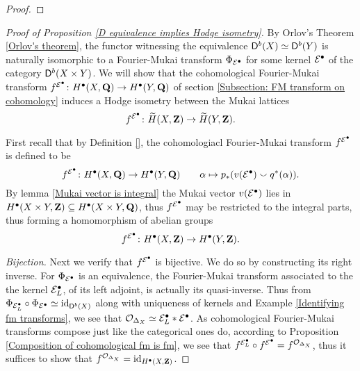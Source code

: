 \begin{proof}

\end{proof}

\begin{proof}[Proof of Proposition \ref{D equivalence implies Hodge isometry}]
    By Orlov's Theorem \ref{Orlov's theorem}, the functor witnessing the equivalence $\mathsf{D}^b(X) \simeq \mathsf{D}^b(Y)$ is naturally isomorphic to a Fourier-Mukai transform $\Phi_{\mathcal E^\bullet}$ for some kernel $\mathcal E^\bullet$ of the category $\mathsf{D}^b(X \times Y)$. We will show that the cohomological Fourier-Mukai transform $f^{\mathcal E^\bullet} \colon H^\bullet(X, \mathbf Q) \to H^\bullet(Y, \mathbf Q)$ of section \ref{Subsection: FM transform on cohomology} induces a Hodge isometry between the Mukai lattices
    \[
        f^{\mathcal E^\bullet} \colon \widetilde{H}(X, \mathbf Z) \to \widetilde{H}(Y, \mathbf Z).
    \]

    First recall that by Definition \ref{}, the cohomologiacl Fourier-Mukai transform $f^{\mathcal E^\bullet}$ is defined to be
    \[
        f^{\mathcal E^\bullet} \colon H^\bullet(X, \mathbf Q) \to H^\bullet(Y, \mathbf Q) \qquad \alpha \mapsto p_*(v(\mathcal E^\bullet) \smallsmile q^*(\alpha)).
    \]
    By lemma \ref{Mukai vector is integral} the Mukai vector $v(\mathcal E^\bullet)$ lies in $H^\bullet(X \times Y, \mathbf Z) \subseteq H^\bullet(X \times Y, \mathbf Q)$, thus $f^{\mathcal E^\bullet}$ may be restricted to the integral parts, thus forming a homomorphism of abelian groups
    \[
        f^{\mathcal E^\bullet} \colon H^\bullet(X, \mathbf Z) \to H^\bullet(Y, \mathbf Z).
    \]

    \noindent
    \textsl{Bijection.}
    Next we verify that $f^{\mathcal E^\bullet}$ is bijective. We do so by constructing its right inverse. For $\Phi_{\mathcal E^\bullet}$ is an equivalence, the Fourier-Mukai transform associated to the the kernel $\mathcal E^\bullet_L$, of its left adjoint, is actually its quasi-inverse. Thus from $\Phi_{\mathcal E^\bullet_L} \circ \Phi_{\mathcal E^\bullet} \simeq \operatorname{id}_{\mathsf{D}^b(X)}$ along with uniqueness of kernels and Example \ref{Identifying fm transforms}, we see that ${\mathcal{O}_{\Delta_X}} \simeq \mathcal E^\bullet_L * \mathcal E^\bullet$. As cohomological Fourier-Mukai transforms compose just like the categorical ones do, according to Proposition \ref{Composition of cohomological fm is fm}, we see that $f^{\mathcal E^\bullet_L} \circ f^{\mathcal E^\bullet} = f^{{\mathcal{O}_{\Delta_X}}}$, thus it suffices to show that $f^{{\mathcal{O}_{\Delta_X}}} = \operatorname{id}_{H^\bullet(X, \mathbf Z)}$.
    

\end{proof}
